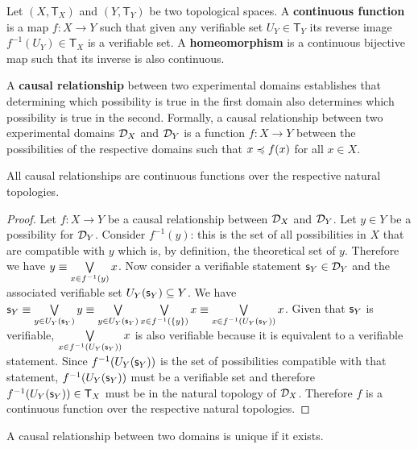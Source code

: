 \begin{mathSection}
	\begin{defn}
		Let $(X, \mathsf{T}_X)$ and $(Y, \mathsf{T}_Y)$ be two topological spaces. A \textbf{continuous function} is a map $f: X \to Y$ such that given any verifiable set $U_Y \in \mathsf{T}_Y$ its reverse image $f^{-1}(U_Y) \in \mathsf{T}_X$ is a verifiable set. A \textbf{homeomorphism} is a continuous bijective map such that its inverse is also continuous.
	\end{defn}
	\begin{defn}
		A \textbf{causal relationship} between two experimental domains establishes that determining which possibility is true in the first domain also determines which possibility is true in the second. Formally, a causal relationship between two experimental domains $\mathcal{D}_X$ and $\mathcal{D}_Y$ is a function $f : X \to Y$ between the possibilities of the respective domains such that $x \preccurlyeq f(x)$ for all $x \in X$.
	\end{defn}
	\begin{coro}
		All causal relationships are continuous functions over the respective natural topologies.
	\end{coro}
	\begin{proof}
		Let $f : X \to Y$ be a causal relationship between $\mathcal{D}_X$ and $\mathcal{D}_Y$. Let $y \in Y$ be a possibility for $\mathcal{D}_Y$. Consider $f^{-1}(y)$: this is the set of all possibilities in $X$ that are compatible with $y$ which is, by definition, the theoretical set of $y$. Therefore we have $y \equiv \bigvee\limits_{x \in f^{-1}(y)} x$. Now consider a verifiable statement $\mathsf{s}_Y \in \mathcal{D}_Y$ and the associated verifiable set $U_Y(\mathsf{s}_Y) \subseteq Y$. We have $\mathsf{s}_Y \equiv \bigvee\limits_{y \in U_Y(\mathsf{s}_Y)} y \equiv \bigvee\limits_{y \in U_Y(\mathsf{s}_Y)} \bigvee\limits_{x \in f^{-1}(\{y\})} x \equiv \bigvee\limits_{x \in f^{-1}(U_Y(\mathsf{s}_Y))} x$. Given that $\mathsf{s}_Y$ is verifiable, $\bigvee\limits_{x \in f^{-1}(U_Y(\mathsf{s}_Y))} x$ is also verifiable because it is equivalent to a verifiable statement. Since $f^{-1}(U_Y(\mathsf{s}_Y))$ is the set of possibilities compatible with that statement, $f^{-1}(U_Y(\mathsf{s}_Y))$ must be a verifiable set and therefore $f^{-1}(U_Y(\mathsf{s}_Y)) \in \mathsf{T}_X$ must be in the natural topology of $\mathcal{D}_{X}$. Therefore $f$ is a continuous function over the respective natural topologies.
	\end{proof}
	\begin{coro}
		A causal relationship between two domains is unique if it exists.

\end{coro}
\end{mathSection}
